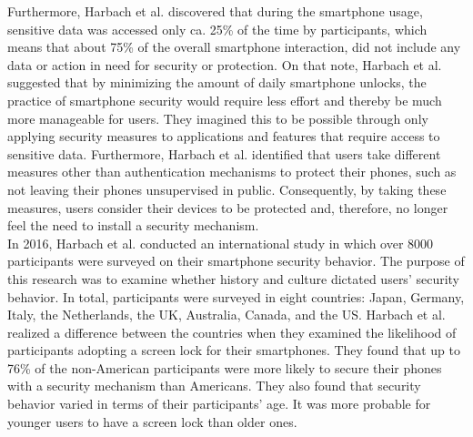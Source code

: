 Furthermore, Harbach et al. \cite{harbach} discovered that during the smartphone usage, sensitive data was accessed only ca. 25\% of the time by participants, which means that about 75\% of the overall smartphone interaction, did not include any data or action in need for security or protection. On that note, Harbach et al. \cite{harbach} suggested that by minimizing the amount of daily smartphone unlocks, the practice of smartphone security would require less effort and thereby be much more manageable for users. They imagined this to be possible through only applying security measures to applications and features that require access to sensitive data. Furthermore, Harbach et al. \cite{harbach} identified that users take different measures other than authentication mechanisms to protect their phones, such as not leaving their phones unsupervised in public. Consequently, by taking these measures, users consider their devices to be protected and, therefore, no longer feel the need to install a security mechanism. \\

In 2016, Harbach et al. \cite{Harbach:2016} conducted an international study in which over 8000 participants were surveyed on their smartphone security behavior. The purpose of this research was to examine whether history and culture dictated users' security behavior. In total, participants were surveyed in eight countries: Japan, Germany, Italy, the Netherlands, the UK, Australia, Canada, and the US. Harbach et al. \cite{Harbach:2016} realized a difference between the countries when they examined the likelihood of participants adopting a screen lock for their smartphones. They found that up to 76\% of the non-American participants were more likely to secure their phones with a security mechanism than Americans. They also found that security behavior varied in terms of their participants' age. It was more probable for younger users to have a screen lock than older ones.\\

